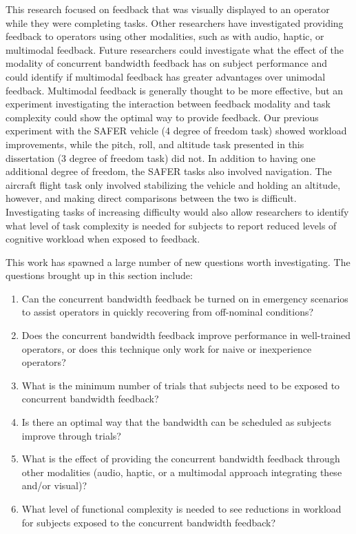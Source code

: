 This research focused on feedback that was visually displayed to an operator while they were completing tasks.
Other researchers have investigated providing feedback to operators using other modalities, such as with audio, haptic, or multimodal feedback.
Future researchers could investigate what the effect of the modality of concurrent bandwidth feedback has on subject performance and could identify if multimodal feedback has greater advantages over unimodal feedback.
Multimodal feedback is generally thought to be more effective, but an experiment investigating the interaction between feedback modality and task complexity could show the optimal way to provide feedback.
Our previous experiment with the SAFER vehicle (4 degree of freedom task) showed workload improvements, while the pitch, roll, and altitude task presented in this dissertation (3 degree of freedom task) did not.
In addition to having one additional degree of freedom, the SAFER tasks also involved navigation.
The aircraft flight task only involved stabilizing the vehicle and holding an altitude, however, and making direct comparisons between the two is difficult.
Investigating tasks of increasing difficulty would also allow researchers to identify what level of task complexity is needed for subjects to report reduced levels of cognitive workload when exposed to feedback.

This work has spawned a large number of new questions worth investigating.
The questions brought up in this section include:
\begin{enumerate}
    \item Can the concurrent bandwidth feedback be turned on in emergency scenarios to assist operators in quickly recovering from off-nominal conditions?
    \item Does the concurrent bandwidth feedback improve performance in well-trained operators, or does this technique only work for naive or inexperience operators?
    \item What is the minimum number of trials that subjects need to be exposed to concurrent bandwidth feedback?
    \item Is there an optimal way that the bandwidth can be scheduled as subjects improve through trials?
    \item What is the effect of providing the concurrent bandwidth feedback through other modalities (audio, haptic, or a multimodal approach integrating these and/or visual)?
    \item What level of functional complexity is needed to see reductions in workload for subjects exposed to the concurrent bandwidth feedback?
\end{enumerate}
